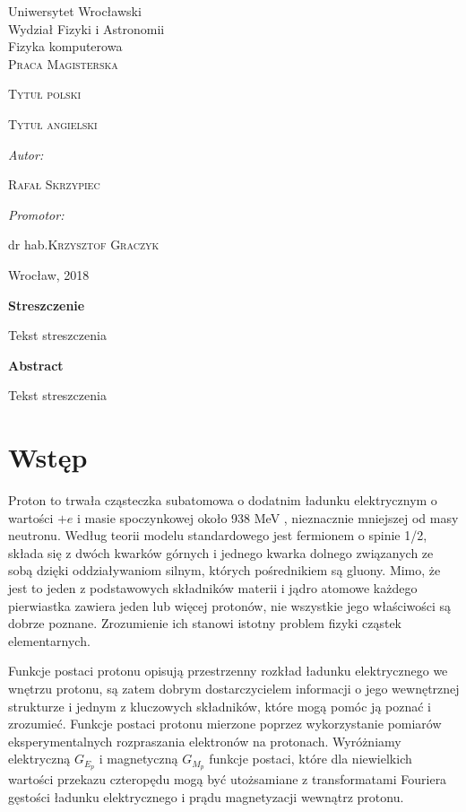 \documentclass[11pt]{book}
\title{}
\author{Rafał Skrzypiec}
\makeatletter
\theoremstyle{definition}
\newcommand\blankpage{%
	\null
	\thispagestyle{empty}%
	\addtocounter{page}{0}%
	\newpage}
\renewcommand{\maketitle}{\begin{titlepage}
		
		
		
		\begin{center}
			{\Large Uniwersytet Wrocławski\\
				\vspace{0.cm}
				Wydział Fizyki i Astronomii\\
				\vspace{0.2cm}
				Fizyka komputerowa} \\
			\vspace{1.8cm}
			\LARGE \textsc{ Praca Magisterska}		
		\end{center}
		
		\vspace{3.5cm}
		
		\noindent
		
		\begin{center}		
			\huge \textsc{\@ Tytuł polski}
			
			\vspace{0.5cm}
			
			\normalsize \textsc {Tytuł angielski}
			
		\end{center}
		
		
		
		\vspace{3cm}
		
		\begin{flushright}
			
			\begin{minipage}{5.5cm}
				
				\textit{\small Autor:}
				
				\normalsize \textsc{\@ Rafał Skrzypiec} \par
				
			\end{minipage}
			
			\vspace{1cm}
			
			
			\begin{minipage}{5.5cm}
				
				\textit{\small Promotor:}
				
				\hspace{0.2cm}dr hab.\textsc{\@ Krzysztof Graczyk} \par
				
			\end{minipage}
			
		\end{flushright}
		
		
		\vspace*{\stretch{4}}
		
		\begin{center}
			
			Wrocław, 2018
			
		\end{center}
		
	\end{titlepage}%
	
}
\makeatother
\begin{document}

\maketitle
\blankpage


\begin{center}
	{\large 	\textbf{Streszczenie}}

\end{center}
\normalsize 
	Tekst streszczenia

\vspace{2cm}

\begin{center}
	{\large 	\textbf{Abstract}}
\end{center}
\normalsize
	Tekst streszczenia

\vspace{2cm}


\tableofcontents
{}
\chapter{Wstęp}

Proton to trwała cząsteczka subatomowa o dodatnim ładunku elektrycznym o wartości $+e$ i masie spoczynkowej około 938 MeV \cite{2012RvMP...84.1527M}, nieznacznie mniejszej od masy neutronu. Według teorii modelu standardowego jest fermionem o spinie 1/2, składa się z dwóch kwarków górnych i jednego kwarka dolnego związanych ze sobą dzięki oddziaływaniom silnym, których pośrednikiem są gluony. Mimo, że jest to jeden z podstawowych składników materii i jądro atomowe każdego pierwiastka zawiera jeden lub więcej protonów, nie wszystkie jego właściwości są dobrze poznane. Zrozumienie ich stanowi istotny problem fizyki cząstek elementarnych.

Funkcje postaci protonu opisują przestrzenny rozkład ładunku elektrycznego we wnętrzu protonu, są zatem dobrym dostarczycielem informacji o jego wewnętrznej strukturze i jednym z kluczowych składników, które mogą pomóc ją poznać i zrozumieć. Funkcje postaci protonu mierzone poprzez wykorzystanie pomiarów eksperymentalnych rozpraszania elektronów na protonach. Wyróżniamy elektryczną $G_{E_p}$ i magnetyczną $G_{M_p}$ funkcje postaci, które dla niewielkich wartości przekazu czteropędu mogą być utożsamiane z transformatami Fouriera gęstości ładunku elektrycznego i prądu magnetyzacji wewnątrz protonu. 
\end{document}
